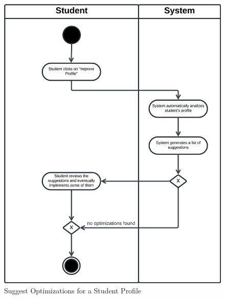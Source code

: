 \begin{figure}[H]
    \begin{center}
         \includegraphics[width=1\linewidth]{LaTeXCode/images/activity diagram/UC19.png}
         \caption{Suggest Optimizations for a Student Profile}
         \label{fig:suggest_optimizations_student_ad}
     \end{center}
\end{figure}

\newpage

